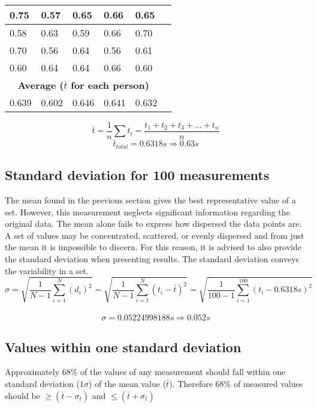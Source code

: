 \documentclass[11pt, letterpaper, includehead]{article}
\begin{document}
\begin{center}
\begin{tabular}{|   m{2cm}  |  m{2cm}  |  m{2cm}  |  m{2cm}  |  m{2cm}  |  m{2cm}  | }
    \hline
    0.75          & 0.57           & 0.65         & 0.66           & 0.65          \\
    \hline
    0.58          & 0.63           & 0.59         & 0.66           & 0.70          \\
    \hline
    0.70          & 0.56           & 0.64         & 0.56           & 0.61          \\
    \hline
    0.60          & 0.64           & 0.64         & 0.66           & 0.60          \\
    \hline
    \hline
    \multicolumn{5}{|c|}{\textbf{Average ($\bar{t}$ for each person)}} \\
    \hline
    0.639         & 0.602          & 0.646        & 0.641          & 0.632         \\
    \hline
  \end{tabular}
\end{center}
$$\bar{t} = \frac{1}{n}\sum t_i = \frac{t_1 + t_2 + t_3 + ... + t_n}{n}$$
$$\bar{t}_{total} = 0.6318s \Rightarrow \boxed{0.63s}$$

\subsection{Standard deviation for 100 measurements} %
The mean found in the previous section gives the best representative 
value of a set. However, this measurement neglects significant 
information regarding the original data. The mean alone fails to 
express how dispersed the data points are. A set of values may be 
concentrated, scattered, or evenly dispersed and from just the mean it is impossible to discern. 
For this reason, it is advised to also provide the standard deviation 
when presenting results. The standard deviation conveys the variability in a set.
$$\sigma = \sqrt{\frac{1}{N - 1}\sum_{i = 1}^{N} (d_i)^2} = \sqrt{\frac{1}{N - 1}\sum_{i = 1}^{N} (t_i - \bar{t})^2}= \sqrt{\frac{1}{100 - 1}\sum_{i = 1}^{100}(t_i - 0.6318s)^2}$$\\
$$\sigma = 0.05224998188s \Rightarrow \boxed{0.052s}$$


\subsection{Values within one standard deviation} %
Approximately $68\%$ of the values of any measurement should fall within one
standard deviation ($1 \sigma$) of the mean value ($\bar{t}$). Therefore $68\%$ of measured
values should be $\geq (\bar{t} - \sigma_t)$ and $\leq (\bar{t} + \sigma_t)$\\
\end{document}
